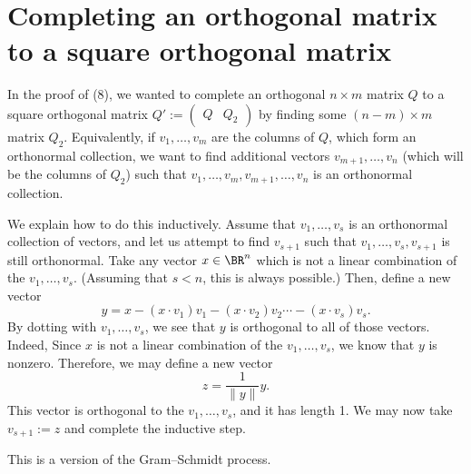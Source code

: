 \documentclass[10pt]{amsart}
\theoremstyle{mythm}
\theoremstyle{definition}
\theoremstyle{myrmk}
\begin{document}
	\section{Completing an orthogonal matrix to a square orthogonal matrix} 
	
	In the proof of (8), we wanted to complete an orthogonal $n \times m$ matrix $Q$ to a square orthogonal matrix $Q' := \left( \begin{array}{c|c} Q & Q_2 \end{array} \right)$ by finding some $(n-m) \times m$ matrix $Q_2$. Equivalently, if $v_1, \ldots, v_m$ are the columns of $Q$, which form an orthonormal collection, we want to find additional vectors $v_{m+1}, \ldots, v_n$ (which will be the columns of $Q_2$) such that $v_1, \ldots, v_m, v_{m+1}, \ldots,  v_n$ is an orthonormal collection. 
	
	We explain how to do this inductively. Assume that $v_1, \ldots, v_s$ is an orthonormal collection of vectors, and let us attempt to find $v_{s+1}$ such that $v_1, \ldots, v_{s}, v_{s+1}$ is still orthonormal. Take any vector $x \in \BR^n$ which is not a linear combination of the $v_1, \ldots, v_s$. (Assuming that $s < n$, this is always possible.) Then, define a new vector 
	\[
		y = x - (x \cdot v_1)v_1 - (x \cdot v_2)v_2\cdots - (x \cdot v_s)v_s. 
	\]
	By dotting with $v_1, \ldots, v_s$, we see that $y$ is orthogonal to all of those vectors. Indeed, 
	Since $x$ is not a linear combination of the $v_1, \ldots, v_s$, we know that $y$ is nonzero. Therefore, we may define a new vector 
	\[
		z = \frac{1}{\lVert y \rVert} y. 
	\]
	This vector is orthogonal to the $v_1, \ldots, v_s$, and it has length 1. We may now take $v_{s+1} := z$ and complete the inductive step. 
	
	This is a version of the Gram--Schmidt process. 
	
	
	
	
	
	
\end{document}
